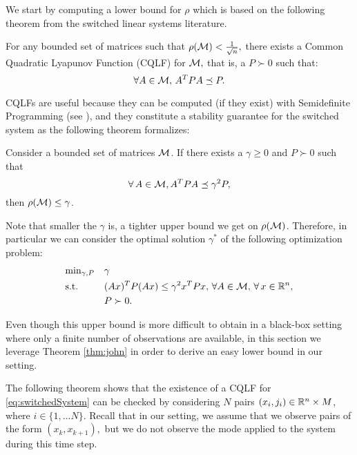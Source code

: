 We start by computing a lower bound for $\rho$ which is based on the following theorem from the switched linear systems literature.
\begin{theorem}\cite[Theorem 2.11]{jungers_lncis}\label{thm:john}
For any bounded set of matrices such that $\rho(\mathcal{M})<\frac{1}{\sqrt{n}},$ there exists a Common Quadratic Lyapunov Function (CQLF) for $\mathcal{M},$ that is, a $P\succ 0$ such that: $$\forall A\in \mathcal{M},\, A^TPA\preceq P. $$
\end{theorem}

CQLFs are useful because they can be computed (if they exist) with Semidefinite Programming (see \cite{boyd}), and they constitute a stability guarantee for the switched system as the following theorem formalizes:
\begin{theorem}\cite[Prop. 2.8]{jungers_lncis}\label{thm:cqlf} Consider a bounded set of matrices $\mathcal{M}$. If there exists a $\gamma \geq 0$ and $P \succ 0$ such that $$\forall\, A \in \mathcal{M}, A^TPA \preceq \gamma^2P,$$ then $\rho(\mathcal{M}) \leq \gamma$.
\end{theorem}
Note that smaller the $\gamma$ is, a tighter upper bound we get on $\rho(\mathcal{M})$. Therefore, in particular we can consider the optimal solution $\gamma^*$ of the following optimization problem:
\begin{equation}\label{eqn:campiOpt0}
\begin{aligned}
& \text{min}_{\gamma, P} & & \gamma \\
& \text{s.t.} 
&  & (Ax)^TP(Ax) \leq \gamma^2 x^TPx,\,\forall A \in \mathcal{M}, \,\forall\, x \in \mathbb{R}^n,\\
& && P \succ 0. \\
\end{aligned}
\end{equation}

Even though this upper bound is more difficult to obtain in a black-box setting where only a finite number of observations are available, in this section we leverage Theorem \ref{thm:john} in order to derive an easy lower bound in our setting.

The following theorem shows that the existence of a CQLF for \eqref{eq:switchedSystem} can be checked by considering $N$ pairs $(x_i, j_i) \in \mathbb{R}^n \times M$, where $i \in \{1, \ldots N\}.$ Recall that in our setting, we assume that we observe pairs of the form $(x_k,x_{k+1}),$ but we do not observe the mode applied to the system during this time step.
%

